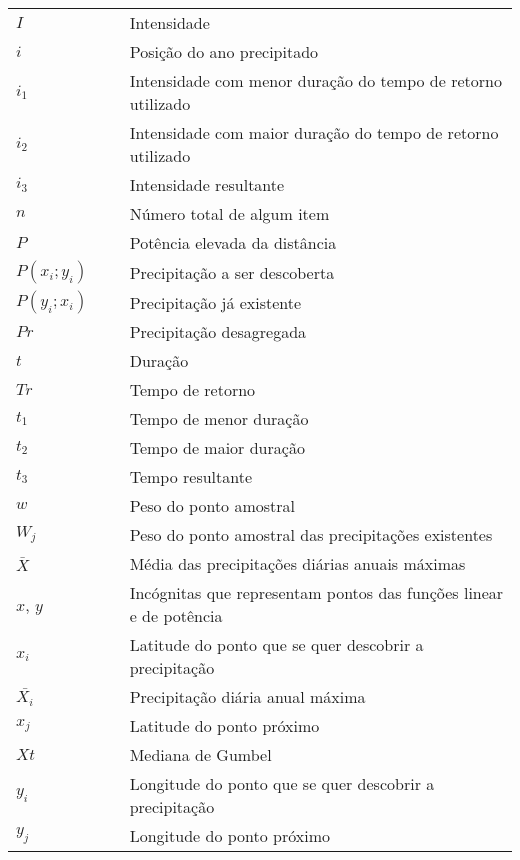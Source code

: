 \newpage

\thispagestyle{empty}

\begin{table}[h!]
	\flushleft
	\renewcommand{\arraystretch}{1.8}
	\begin{tabular}{lp{.3cm}l}
$ I \quad\quad\quad\quad \ \ \ $ && Intensidade \\
$ i $ && Posição do ano precipitado \\
$ i_1 $ && Intensidade com menor duração do tempo de retorno utilizado \\
$ i_2 $ && Intensidade com maior duração do tempo de retorno utilizado \\
$ i_3 $ && Intensidade resultante \\
$ n $ && Número total de algum item \\
$ P $ && Potência elevada da distância \\
$ P(x_i ; y_i) $ && Precipitação a ser descoberta \\
$ P(y_i ; x_i) $ && Precipitação já existente \\
$ Pr $ && Precipitação desagregada \\
$ t $ && Duração \\
$ Tr $ && Tempo de retorno \\
$ t_1 $ && Tempo de menor duração \\
$ t_2 $ && Tempo de maior duração \\
$ t_3 $ && Tempo resultante \\
$ w $ && Peso do ponto amostral \\
$ W_j $ && Peso do ponto amostral das precipitações existentes \\
$ \bar{X} $ && Média das precipitações diárias anuais máximas \\
$ x $, $ y $ && Incógnitas que representam pontos das funções linear e de potência \\
$ x_i $ && Latitude do ponto que se quer descobrir a precipitação \\
$ \bar{X_i} $ && Precipitação diária anual máxima \\ 
$ x_j $ && Latitude do ponto próximo \\
$ Xt $ && Mediana de Gumbel \\
$ y_i $ && Longitude do ponto que se quer descobrir a precipitação \\
$ y_j $ && Longitude do ponto próximo \\
\end{tabular} 
\end{table}
